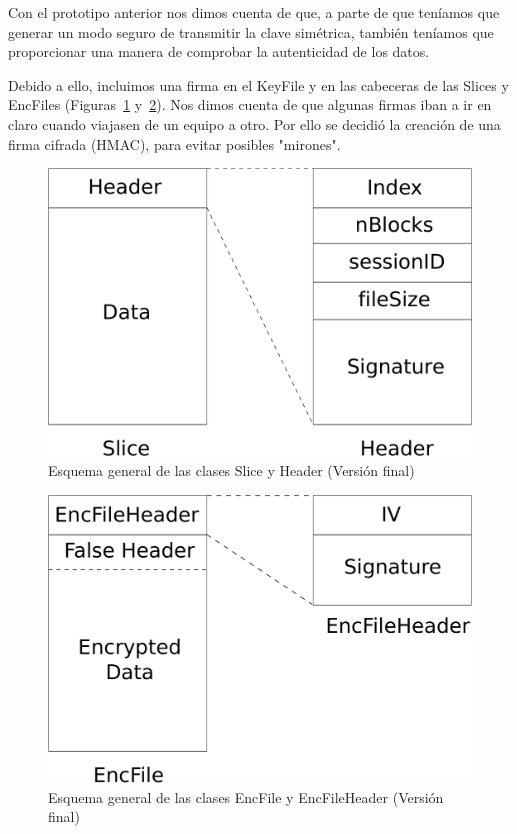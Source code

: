 Con el prototipo anterior nos dimos cuenta de que, a parte de que teníamos que
generar un modo seguro de transmitir la clave simétrica, también teníamos que
proporcionar una manera de comprobar la autenticidad de los datos.

Debido a ello, incluimos una firma en el KeyFile y en las cabeceras de las
Slices y EncFiles (Figuras~\ref{fig:Slice_Header_2} y~\ref{fig:EncFile_Header_2}).
Nos dimos cuenta de que algunas firmas iban a ir en claro cuando viajasen de un
equipo a otro. Por ello se decidió la creación de una firma cifrada (HMAC),
para evitar posibles "mirones".

\begin{figure}[ht]
  \centering
  \includegraphics[scale=0.4]{Figures/Slice_Header_2}
  \decoRule
  \caption[Slice - Header (Versión final)]{Esquema general de las clases Slice y Header (Versión final)}
  \label{fig:Slice_Header_2}
\end{figure}

\begin{figure}[ht]
  \centering
  \includegraphics[scale=0.4]{Figures/EncFile_Header_2}
  \decoRule
  \caption[EncFile - EncFileHeader (Versión final)]{Esquema general de las clases EncFile y EncFileHeader (Versión final)}
  \label{fig:EncFile_Header_2}
\end{figure}

